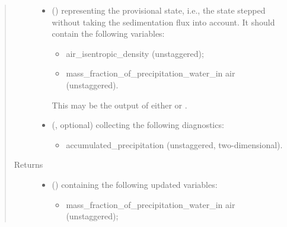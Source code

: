 \documentclass[letterpaper,10pt,english]{sphinxmanual}
\begin{document}
\begin{fulllineitems}
\begin{fulllineitems}
\begin{quote}
\begin{description}
\begin{itemize}
\item {} 
 () \textendash{} 
{\hyperref[\detokenize{api:tasmania.storages.state_isentropic.StateIsentropic}]{}} representing the provisional state, i.e.,
the state stepped without taking the sedimentation flux into account.
It should contain the following variables:
\begin{itemize}
\item {} 
air\_isentropic\_density (unstaggered);

\item {} 
mass\_fraction\_of\_precipitation\_water\_in air (unstaggered).

\end{itemize}

This may be the output of either
{\hyperref[\detokenize{api:tasmania.dycore.prognostic_isentropic.PrognosticIsentropic.step_neglecting_vertical_advection}]{}} or
{\hyperref[\detokenize{api:tasmania.dycore.prognostic_isentropic.PrognosticIsentropic.step_coupling_physics_with_dynamics}]{}}.


\item {} 
 (, optional) \textendash{} 
{\hyperref[\detokenize{api:tasmania.storages.grid_data.GridData}]{}} collecting the following diagnostics:
\begin{itemize}
\item {} 
accumulated\_precipitation (unstaggered, two-dimensional).

\end{itemize}


\end{itemize}

\item[{Returns}] \leavevmode
\begin{itemize}
\item {} 
 () \textendash{} {\hyperref[\detokenize{api:tasmania.storages.state_isentropic.StateIsentropic}]{}} containing the following updated variables:
\begin{itemize}
\item {} 
mass\_fraction\_of\_precipitation\_water\_in air (unstaggered);


\end{itemize}
\end{itemize}
\end{description}
\end{quote}
\end{fulllineitems}
\end{fulllineitems}
\end{document}
